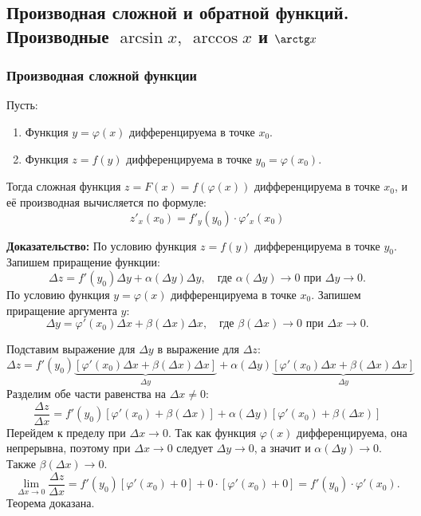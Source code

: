 \subsection{Производная сложной и обратной функций. \\Производные $\arcsin x,\ \arccos x$ и $\arctg x$}

\subsubsection*{Производная сложной функции}

\begin{tcolorbox}[title=Теорема (О производной сложной функции)]
    Пусть:
    \begin{enumerate}
        \item Функция $y = \varphi(x)$ дифференцируема в точке $x_0$.
        \item Функция $z = f(y)$ дифференцируема в точке $y_0 = \varphi(x_0)$.
    \end{enumerate}
    Тогда сложная функция $z = F(x) = f(\varphi(x))$ дифференцируема в точке $x_0$, и её производная вычисляется по формуле:
    \[ z'_x(x_0) = f'_y(y_0) \cdot \varphi'_x(x_0) \]
\end{tcolorbox}

\textbf{Доказательство:}
По условию функция $z = f(y)$ дифференцируема в точке $y_0$. Запишем приращение функции:
\[ \Delta z = f'(y_0)\Delta y + \alpha(\Delta y)\Delta y, \quad \text{где } \alpha(\Delta y) \to 0 \text{ при } \Delta y \to 0. \]
По условию функция $y = \varphi(x)$ дифференцируема в точке $x_0$. Запишем приращение аргумента $y$:
\[ \Delta y = \varphi'(x_0)\Delta x + \beta(\Delta x)\Delta x, \quad \text{где } \beta(\Delta x) \to 0 \text{ при } \Delta x \to 0. \]

Подставим выражение для $\Delta y$ в выражение для $\Delta z$:
\[ \Delta z = f'(y_0) \underbrace{\left[ \varphi'(x_0)\Delta x + \beta(\Delta x)\Delta x \right]}_{\Delta y} + \alpha(\Delta y) \underbrace{\left[ \varphi'(x_0)\Delta x + \beta(\Delta x)\Delta x \right]}_{\Delta y} \]
Разделим обе части равенства на $\Delta x \neq 0$:
\[ \frac{\Delta z}{\Delta x} = f'(y_0)[\varphi'(x_0) + \beta(\Delta x)] + \alpha(\Delta y)[\varphi'(x_0) + \beta(\Delta x)] \]
Перейдем к пределу при $\Delta x \to 0$.
Так как функция $\varphi(x)$ дифференцируема, она непрерывна, поэтому при $\Delta x \to 0$ следует $\Delta y \to 0$, а значит и $\alpha(\Delta y) \to 0$. Также $\beta(\Delta x) \to 0$.
\[ \lim_{\Delta x \to 0} \frac{\Delta z}{\Delta x} = f'(y_0)[\varphi'(x_0) + 0] + 0 \cdot [\varphi'(x_0) + 0] = f'(y_0) \cdot \varphi'(x_0). \]
Теорема доказана.

